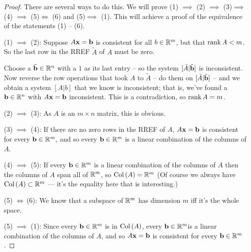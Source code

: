 \begin{proof} There are several ways to do this. We will prove  (1) $\implies$ (2) $\implies$  (3)$\implies$    (4)  $\implies$ (5)$\iff$ (6) and (5)$\implies$ (1). This will achieve a proof of the equivalence of the statements (1) -- (6).


(1) $\implies$ (2): Suppose $A\mathbf{x}=\mathbf{b}$ is consistent for all $b\in \mathbb{R}^m$, but that $\operatorname{rank} A <m$. So the last row   in the RREF $\tilde A$ of $A$ must be zero. 

Choose a $\tilde{\mathbf{b}} \in \mathbb{R}^n$ with a $1$ as its last entry   -- so the system $[\tilde A | \tilde{\mathbf{b}}]$ is inconsistent. Now reverse the row operations that took $A$ to $\tilde A$ -- do them on $[ \tilde A | \tilde{\mathbf{b}}]$ -- and we obtain a system $[   A |   b]$ that we know is inconsistent; that is, we've  found a $\mathbf{b}\in \mathbb{R}^n$ with $A\mathbf{x}=\mathbf{b}$ inconsistent. This is a contradiction, so    $\operatorname{rank} A =m$.

 

(2) $\implies$ (3): As $A$ is an $m \times n$ matrix, this is obvious.

(3) $\implies$ (4): If there are no zero rows in the RREF of $A$, $A \mathbf{x}=\mathbf{b}$ is consistent for every $\mathbf{b} \in \mathbb{R}^m$, and so every $\mathbf{b} \in \mathbb{R}^m$ is a linear combination of the columns of
$A$.


 (4) $\implies$ (5): If every $\mathbf{b} \in \mathbb{R}^m$ is a linear combination of the columns of
$A$ then the columns of $A$ span all of $\mathbb{R}^m$, so $\operatorname{Col\,}(A) = \mathbb{R}^m$
(Of course we always have $\operatorname{Col\,}(A) \subset \mathbb{R}^m$ --- it's the equality
here that is interesting.)

(5) $\iff \,$(6):  We know that a subspace of $\mathbb{R}^m$ has dimension $m$ iff it's the whole
space.

(5) $\implies$ (1):  Since every $\mathbf{b} \in \mathbb{R}^m$ is in $\operatorname{Col\,}(A)$, every $\mathbf{b} \in \mathbb{R}^m$is a linear combination of the columns of $A$, and so $A\mathbf{x}=\mathbf{b}$  is consistent for every $\mathbf{b} \in \mathbb{R}^m$.
\end{proof}

 


